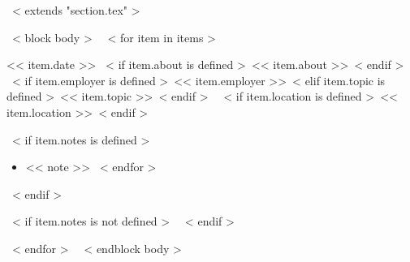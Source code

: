 ~< extends "section.tex" >~

~< block body >~
  ~< for item in items >~
    \begin{samepage}
      \cventry
        {<< item.date >>}
        {~< if item.about is defined >~<< item.about >>~< endif >~}
        {~< if item.employer is defined >~<< item.employer >>~< elif item.topic is defined >~<< item.topic >>~< endif >~}
        {~< if item.location is defined >~<< item.location >>~< endif >~}
        {}
        { %
          ~< if item.notes is defined >~
            \begin{itemize}
              ~< for note in item.notes >~
                \item{<< note >>}
              ~< endfor >~
            \end{itemize}
          ~< endif >~
        }
        ~< if item.notes is not defined >~
          \vspace{-1em}
        ~< endif >~
    \end{samepage}
    \vspace{10pt}
  ~< endfor >~
  \vspace{-10pt}
~< endblock body >~
